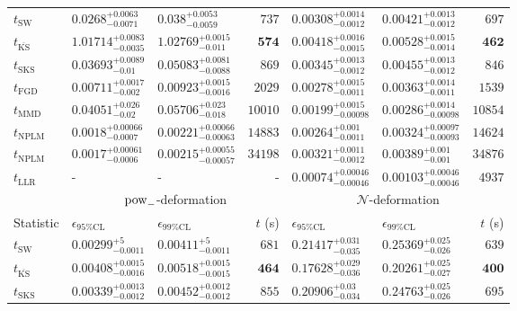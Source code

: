\begin{tabular}{l|llr|llr}
	\midrule
	$t_{\mathrm{SW}}$ & $0.0268_{-0.0071}^{+0.0063}$ & $0.038_{-0.0059}^{+0.0053}$ & $737$ & $0.00308_{-0.0012}^{+0.0014}$ & $0.00421_{-0.0012}^{+0.0013}$ & $697$ \\
	$t_{\overline{\mathrm{KS}}}$ & $1.01714_{-0.0035}^{+0.0083}$ & $1.02769_{-0.011}^{+0.0015}$ & ${\mathbf{574}}$ & $0.00418_{-0.0015}^{+0.0016}$ & $0.00528_{-0.0014}^{+0.0015}$ & ${\mathbf{462}}$ \\
	$t_{\mathrm{SKS}}$ & $0.03693_{-0.01}^{+0.0089}$ & $0.05083_{-0.0088}^{+0.0081}$ & $869$ & $0.00345_{-0.0012}^{+0.0013}$ & $0.00455_{-0.0012}^{+0.0013}$ & $846$ \\
	$t_{\mathrm{FGD}}$ & ${\mathbf{0.00711_{-0.002}^{+0.0017}}}$ & ${\mathbf{0.00923_{-0.0016}^{+0.0015}}}$ & $2029$ & $0.00278_{-0.0011}^{+0.0015}$ & $0.00363_{-0.0011}^{+0.0014}$ & $1539$ \\
	$t_{\mathrm{MMD}}$ & $0.04051_{-0.02}^{+0.026}$ & $0.05706_{-0.018}^{+0.023}$ & $10010$ & ${\mathbf{0.00199_{-0.00098}^{+0.0015}}}$ & ${\mathbf{0.00286_{-0.00098}^{+0.0014}}}$ & $10854$ \\
\rowcolor{red!35}	$t_{\mathrm{NPLM}}$ & $0.0018_{-0.0007}^{+0.00066}$ & $0.00221_{-0.00063}^{+0.00066}$ & $14883$ & $0.00264_{-0.0011}^{+0.001}$ & $0.00324_{-0.00093}^{+0.00097}$ & $14624$ \\
\rowcolor{blue!35}	$t_{\mathrm{NPLM}}$ & $0.0017_{-0.0006}^{+0.00061}$ & $0.00215_{-0.00057}^{+0.00055}$ & $34198$ & $0.00321_{-0.0012}^{+0.0011}$ & $0.00389_{-0.001}^{+0.001}$ & $34876$ \\
	$t_{\mathrm{LLR}}$ & - & - & - & $0.00074_{-0.00046}^{+0.00046}$ & $0.00103_{-0.00046}^{+0.00046}$ & $4937$ \\
	\toprule
	\multicolumn{1}{c}{} & \multicolumn{3}{c}{$\rm{pow}_{-}$-deformation} & \multicolumn{3}{c}{$\mathcal{N}$-deformation} \\
	Statistic & $\epsilon_{95\%\mathrm{CL}}$ & $\epsilon_{99\%\mathrm{CL}}$ & $t$ (s) & $\epsilon_{95\%\mathrm{CL}}$ & $\epsilon_{99\%\mathrm{CL}}$ & $t$ (s) \\
	\midrule
	$t_{\mathrm{SW}}$ & $0.00299_{-0.0011}^{+5}$ & $0.00411_{-0.0011}^{+5}$ & $681$ & $0.21417_{-0.035}^{+0.031}$ & $0.25369_{-0.026}^{+0.025}$ & $639$ \\
	$t_{\overline{\mathrm{KS}}}$ & $0.00408_{-0.0016}^{+0.0015}$ & $0.00518_{-0.0015}^{+0.0015}$ & ${\mathbf{464}}$ & $0.17628_{-0.036}^{+0.029}$ & $0.20261_{-0.027}^{+0.025}$ & ${\mathbf{400}}$ \\
	$t_{\mathrm{SKS}}$ & $0.00339_{-0.0012}^{+0.0013}$ & $0.00452_{-0.0012}^{+0.0012}$ & $855$ & $0.20906_{-0.034}^{+0.03}$ & $0.24763_{-0.026}^{+0.025}$ & $695$ \\

\end{tabular}
